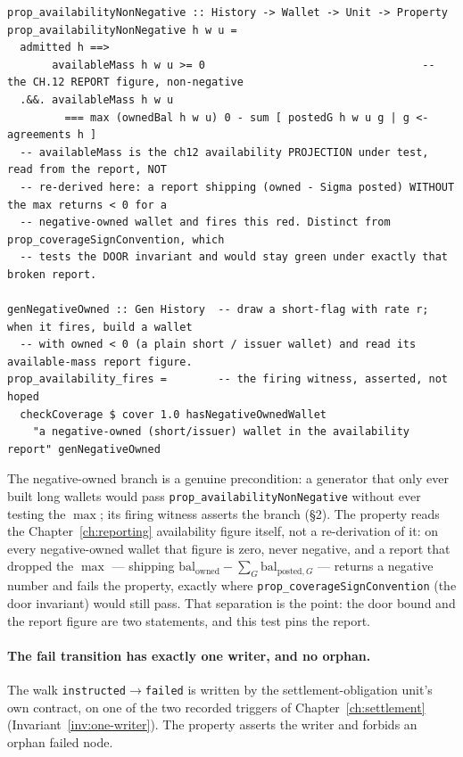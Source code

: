 \documentclass[11pt,a4paper]{article}
\begin{document}
\begin{lstlisting}
prop_availabilityNonNegative :: History -> Wallet -> Unit -> Property
prop_availabilityNonNegative h w u =
  admitted h ==>
       availableMass h w u >= 0                                  -- the CH.12 REPORT figure, non-negative
  .&&. availableMass h w u
         === max (ownedBal h w u) 0 - sum [ postedG h w u g | g <- agreements h ]
  -- availableMass is the ch12 availability PROJECTION under test, read from the report, NOT
  -- re-derived here: a report shipping (owned - Sigma posted) WITHOUT the max returns < 0 for a
  -- negative-owned wallet and fires this red. Distinct from prop_coverageSignConvention, which
  -- tests the DOOR invariant and would stay green under exactly that broken report.

genNegativeOwned :: Gen History  -- draw a short-flag with rate r; when it fires, build a wallet
  -- with owned < 0 (a plain short / issuer wallet) and read its available-mass report figure.
prop_availability_fires =        -- the firing witness, asserted, not hoped
  checkCoverage $ cover 1.0 hasNegativeOwnedWallet
    "a negative-owned (short/issuer) wallet in the availability report" genNegativeOwned
\end{lstlisting}

The negative-owned branch is a genuine precondition: a generator that only ever built long wallets
would pass \texttt{prop\_availabilityNonNegative} without ever testing the $\max$; its firing
witness asserts the branch (\S 2). The property reads the Chapter~\ref{ch:reporting} availability
figure itself, not a re-derivation of it: on every negative-owned wallet that figure is zero, never
negative, and a report that dropped the $\max$ --- shipping $\mathrm{bal}_{\text{owned}}-\sum_G
\mathrm{bal}_{\text{posted},G}$ --- returns a negative number and fails the property, exactly where
\texttt{prop\_coverageSignConvention} (the door invariant) would still pass. That separation is the
point: the door bound and the report figure are two statements, and this test pins the report.

\paragraph{The fail transition has exactly one writer, and no orphan.}
The walk \texttt{instructed}$\to$\texttt{failed} is written by the settlement-obligation unit's
own contract, on one of the two recorded triggers of Chapter~\ref{ch:settlement}
(Invariant~\ref{inv:one-writer}). The property asserts the writer and forbids an orphan
failed node.
\end{document}
